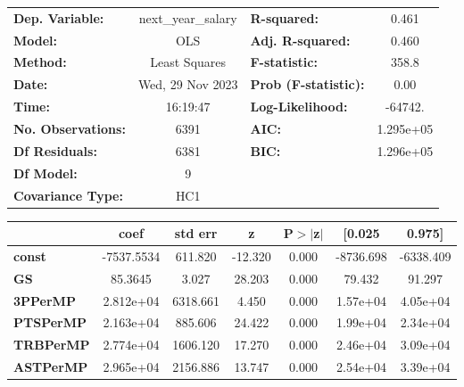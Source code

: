 \begin{center}
\begin{tabular}{lclc}
\toprule
\textbf{Dep. Variable:}    & next\_year\_salary & \textbf{  R-squared:         } &     0.461   \\
\textbf{Model:}            &        OLS         & \textbf{  Adj. R-squared:    } &     0.460   \\
\textbf{Method:}           &   Least Squares    & \textbf{  F-statistic:       } &     358.8   \\
\textbf{Date:}             &  Wed, 29 Nov 2023  & \textbf{  Prob (F-statistic):} &     0.00    \\
\textbf{Time:}             &      16:19:47      & \textbf{  Log-Likelihood:    } &   -64742.   \\
\textbf{No. Observations:} &         6391       & \textbf{  AIC:               } & 1.295e+05   \\
\textbf{Df Residuals:}     &         6381       & \textbf{  BIC:               } & 1.296e+05   \\
\textbf{Df Model:}         &            9       & \textbf{                     } &             \\
\textbf{Covariance Type:}  &        HC1         & \textbf{                     } &             \\
\bottomrule
\end{tabular}
\begin{tabular}{lcccccc}
                       & \textbf{coef} & \textbf{std err} & \textbf{z} & \textbf{P$> |$z$|$} & \textbf{[0.025} & \textbf{0.975]}  \\
\midrule
\textbf{const}         &   -7537.5534  &      611.820     &   -12.320  &         0.000        &    -8736.698    &    -6338.409     \\
\textbf{GS}            &      85.3645  &        3.027     &    28.203  &         0.000        &       79.432    &       91.297     \\
\textbf{3PPerMP}       &    2.812e+04  &     6318.661     &     4.450  &         0.000        &     1.57e+04    &     4.05e+04     \\
\textbf{PTSPerMP}      &    2.163e+04  &      885.606     &    24.422  &         0.000        &     1.99e+04    &     2.34e+04     \\
\textbf{TRBPerMP}      &    2.774e+04  &     1606.120     &    17.270  &         0.000        &     2.46e+04    &     3.09e+04     \\
\textbf{ASTPerMP}      &    2.965e+04  &     2156.886     &    13.747  &         0.000        &     2.54e+04    &     3.39e+04     \\

\end{tabular}
\end{center}
